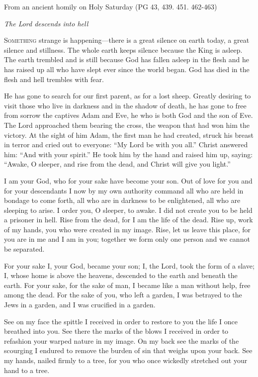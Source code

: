 \noindent From an ancient homily on Holy Saturday \hfill(PG 43, 439. 451. 462-463)

\begin{center}\textit{The Lord descends into hell}\end{center}

\lettrine[lines=3,loversize=0.15]{S}{omething} strange is happening—there is a great silence on earth today, a great silence and stillness. The whole earth keeps silence because the King is asleep. The earth trembled and is still because God has fallen asleep in the flesh and he has raised up all who have slept ever since the world began. God has died in the flesh and hell trembles with fear.

He has gone to search for our first parent, as for a lost sheep. Greatly desiring to visit those who live in darkness and in the shadow of death, he has gone to free from sorrow the captives Adam and Eve, he who is both God and the son of Eve. The Lord approached them bearing the cross, the weapon that had won him the victory. At the sight of him Adam, the first man he had created, struck his breast in terror and cried out to everyone: “My Lord be with you all.” Christ answered him: “And with your spirit.” He took him by the hand and raised him up, saying: “Awake, O sleeper, and rise from the dead, and Christ will give you light.”

I am your God, who for your sake have become your son. Out of love for you and for your descendants I now by my own authority command all who are held in bondage to come forth, all who are in darkness to be enlightened, all who are sleeping to arise. I order you, O sleeper, to awake. I did not create you to be held a prisoner in hell. Rise from the dead, for I am the life of the dead. Rise up, work of my hands, you who were created in my image. Rise, let us leave this place, for you are in me and I am in you; together we form only one person and we cannot be separated.

For your sake I, your God, became your son; I, the Lord, took the form of a slave; I, whose home is above the heavens, descended to the earth and beneath the earth. For your sake, for the sake of man, I became like a man without help, free among the dead. For the sake of you, who left a garden, I was betrayed to the Jews in a garden, and I was crucified in a garden.

See on my face the spittle I received in order to restore to you the life I once breathed into you. See there the marks of the blows I received in order to refashion your warped nature in my image. On my back see the marks of the scourging I endured to remove the burden of sin that weighs upon your back. See my hands, nailed firmly to a tree, for you who once wickedly stretched out your hand to a tree.

